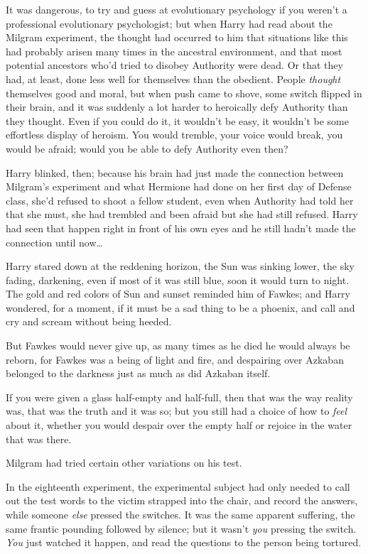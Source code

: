 It was dangerous, to try and guess at evolutionary psychology if you weren't a 
professional evolutionary psychologist; but when Harry had read about the 
Milgram experiment, the thought had occurred to him that situations like this 
had probably arisen many times in the ancestral environment, and that most 
potential ancestors who'd tried to disobey Authority were dead. Or that they 
had, at least, done less well for themselves than the obedient. People 
\emph{thought} themselves good and moral, but when push came to shove, some 
switch flipped in their brain, and it was suddenly a lot harder to heroically 
defy Authority than they thought. Even if you could do it, it wouldn't be easy, 
it wouldn't be some effortless display of heroism. You would tremble, your 
voice would break, you would be afraid; would you be able to defy Authority 
even then?

Harry blinked, then; because his brain had just made the connection between 
Milgram's experiment and what Hermione had done on her first day of Defense 
class, she'd refused to shoot a fellow student, even when Authority had told 
her that she must, she had trembled and been afraid but she had still refused. 
Harry had seen that happen right in front of his own eyes and he still hadn't 
made the connection until now{\ldots}

Harry stared down at the reddening horizon, the Sun was sinking lower, the sky 
fading, darkening, even if most of it was still blue, soon it would turn to 
night. The gold and red colors of Sun and sunset reminded him of Fawkes; and 
Harry wondered, for a moment, if it must be a sad thing to be a phoenix, and 
call and cry and scream without being heeded.

But Fawkes would never give up, as many times as he died he would always be 
reborn, for Fawkes was a being of light and fire, and despairing over Azkaban 
belonged to the darkness just as much as did Azkaban itself.

If you were given a glass half-empty and half-full, then that was the way 
reality was, that was the truth and it was so; but you still had a choice of 
how to \emph{feel} about it, whether you would despair over the empty half or 
rejoice in the water that was there.

Milgram had tried certain other variations on his test.

In the eighteenth experiment, the experimental subject had only needed to call 
out the test words to the victim strapped into the chair, and record the 
answers, while someone \emph{else} pressed the switches. It was the same 
apparent suffering, the same frantic pounding followed by silence; but it 
wasn't \emph{you} pressing the switch. \emph{You} just watched it happen, and 
read the questions to the person being tortured.

